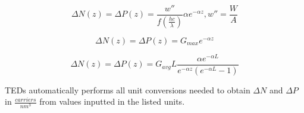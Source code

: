 \documentclass[11pt,letterpaper,titlepage]{article}
\begin{document}
			\begin{equation}
				\label{eq:LGC_powerdensity}
				\Delta N(z) = \Delta P(z) = \frac{w''}{f\left(\frac{hc}{\lambda}\right)} \alpha e^{-\alpha z}, w''=\frac{W}{A}
			\end{equation}
		
			\begin{equation}
				\label{eq:LGC_maxgen}
				\Delta N(z) = \Delta P(z) = G_{max} e^{-\alpha z}
			\end{equation}
		
			\begin{equation}
				\label{eq:LGC_avggen}
				\Delta N(z) = \Delta P(z) = G_{avg}L\frac{\alpha e^{-\alpha L}}{e^{-\alpha z}\left(e^{-\alpha L} - 1 \right)}
			\end{equation}
		
			\par TEDs automatically performs all unit conversions needed to obtain $\Delta N$ and $\Delta P$ in $\frac{carriers}{nm^{3}}$ from values inputted in the listed units.
			
\end{document}
